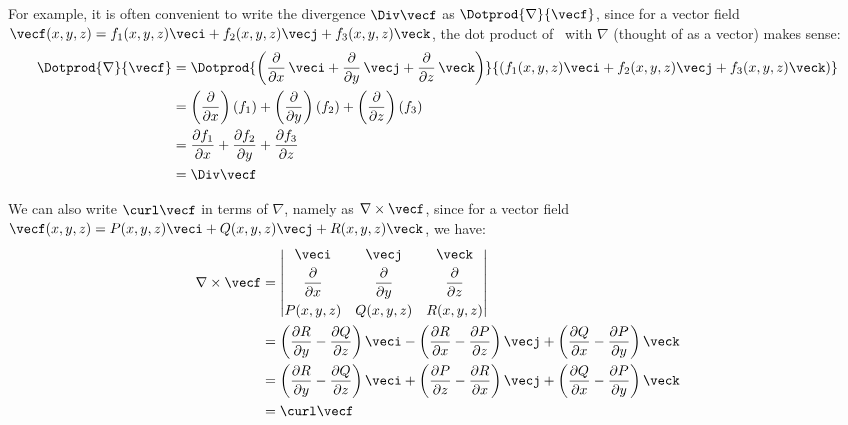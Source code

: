 For example, it is often convenient to write the divergence $\Div\vecf$ as $\Dotprod{\nabla}{\vecf}$, since for a vector field $\vecf(x,y,z) = f_1(x,y,z)\veci + f_2(x,y,z) \vecj + f_3(x,y,z) \veck$, the dot product of \vecf\ with $\nabla$ (thought of as a vector) makes sense:
\begin{align}
 \Dotprod{\nabla}{\vecf} &= \Dotprod{ \left( \frac{\partial}{\partial x}\,\veci +
  \frac{\partial}{\partial y}\,\vecj + \frac{\partial}{\partial z}\,\veck \right) }{\left( f_1(x,y,z)
  \veci + f_2(x,y,z) \vecj + f_3(x,y,z) \veck \right) }\notag\\
   &= \left( \frac{\partial}{\partial x} \right) (f_1) +
    \left( \frac{\partial}{\partial y} \right) (f_2) +
    \left( \frac{\partial}{\partial z} \right) (f_3)\notag\\
   &= \frac{\partial f_1}{\partial x} + \frac{\partial f_2}{\partial y} +
  \frac{\partial f_3}{\partial z}\notag\\
   &= \Div\vecf\label{nabladiv}
\end{align}

We can also write $\curl\vecf$ in terms of $\nabla$, namely as $\nabla\times\vecf$, since for a vector field $\vecf(x,y,z) = P(x,y,z)\veci + Q(x,y,z)\vecj + R(x,y,z)\veck$, we have:
\begin{align}
 \nabla\times\vecf &=
 \begin{vmatrix}
  \veci & \vecj & \veck \vspace{1mm}\\ \dfrac{\partial}{\partial x} & \dfrac{\partial}{\partial y} &
   \dfrac{\partial}{\partial z} \vspace{1mm}\\
  P(x,y,z) & Q(x,y,z) & R(x,y,z)
 \end{vmatrix}\notag\\
 &= \left( \frac{\partial R}{\partial y} - \frac{\partial Q}{\partial z} \right) \veci -
    \left( \frac{\partial R}{\partial x} - \frac{\partial P}{\partial z} \right) \vecj +
    \left( \frac{\partial Q}{\partial x} - \frac{\partial P}{\partial y} \right) \veck\notag\\
 &= \left( \frac{\partial R}{\partial y} - \frac{\partial Q}{\partial z} \right) \veci +
    \left( \frac{\partial P}{\partial z} - \frac{\partial R}{\partial x} \right) \vecj +
    \left( \frac{\partial Q}{\partial x} - \frac{\partial P}{\partial y} \right) \veck\notag\\
 &= \curl\vecf\label{nablacurl}
\end{align}

